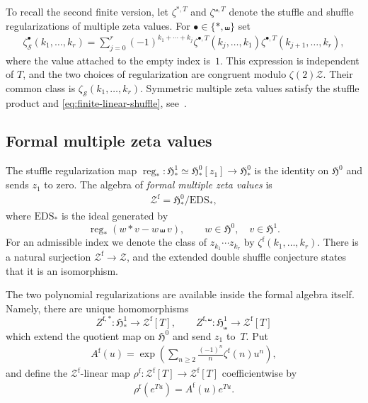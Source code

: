 \documentclass[12pt]{amsart}
\numberwithin{equation}{section}
\theoremstyle{plain}
\newcommand{\h}{\mathfrak H}
\newcommand{\Zf}{{\mathcal Z^{\mathrm f}}}
\newcommand{\zs}[1]{\zeta_{\mathcal S}(#1)}
\newcommand{\zf}[1]{\zeta^{\mathrm f}(#1)}
\begin{document}
To recall the second finite version, let $\zeta^{*,T}$ and $\zeta^{\shuffle,T}$ denote the stuffle and shuffle regularizations of multiple zeta values. For $\bullet\in\{*,\shuffle\}$ set
\begin{align}\label{eq:symmetric-classical}
 \zeta_{\mathcal S}^{\bullet}(k_1,\ldots,k_r)
 =\sum_{j=0}^r(-1)^{k_1+\cdots+k_j}
 \zeta^{\bullet,T}(k_j,\ldots,k_1)
 \zeta^{\bullet,T}(k_{j+1},\ldots,k_r),
\end{align}
where the value attached to the empty index is~$1$. This expression is independent of $T$, and the two choices of regularization are congruent modulo $\zeta(2)\mathcal Z$. Their common class is $\zs{k_1,\ldots,k_r}$. Symmetric multiple zeta values satisfy the stuffle product and \eqref{eq:finite-linear-shuffle}, see~\cite{KZ,Kaneko}.

\subsection{Formal multiple zeta values}

The stuffle regularization map $\operatorname{reg}_*: \h^1_*\simeq\h^0_*[z_1]\to\h^0_*$ is the identity on $\h^0$ and sends $z_1$ to zero. The algebra of \emph{formal multiple zeta values} is
\begin{align}\label{eq:formal-mzv}
 \Zf=\h^0_*\big/\mathrm{EDS}_*,
\end{align}
where $\mathrm{EDS}_*$ is the ideal generated by
\[
 \operatorname{reg}_*(w*v-w\shuffle v),
 \qquad w\in\h^0,\quad v\in\h^1.
\]
For an admissible index we denote the class of $z_{k_1}\cdots z_{k_r}$ by $\zf{k_1,\ldots,k_r}$. There is a natural surjection $\Zf\to\mathcal Z$, and the extended double shuffle conjecture states that it is an isomorphism.

The two polynomial regularizations are available inside the formal algebra itself. Namely, there are unique homomorphisms
\[
 Z^{\mathrm f,*}:\h^1_*\longrightarrow\Zf[T],
 \qquad
 Z^{\mathrm f,\shuffle}:\h^1_\shuffle\longrightarrow\Zf[T]
\]
which extend the quotient map on $\h^0$ and send $z_1$ to~$T$. Put
\begin{align}\label{eq:formal-A}
 A^{\mathrm f}(u)=\exp\left(\sum_{n\geq2}\frac{(-1)^n}{n}\zf{n}u^n\right),
\end{align}
and define the $\Zf$-linear map $\rho^{\mathrm f}:\Zf[T]\to\Zf[T]$ coefficientwise by
\begin{align}\label{eq:formal-rho}
 \rho^{\mathrm f}(e^{Tu})=A^{\mathrm f}(u)e^{Tu}.
\end{align}
\end{document}
